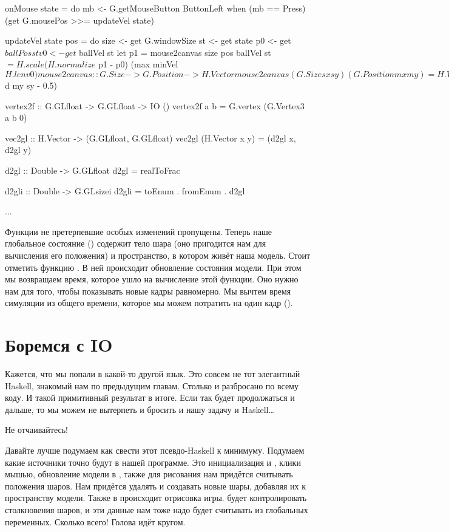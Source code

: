 \begin{code}
onMouse state = do    
    mb <- G.getMouseButton ButtonLeft
    when (mb == Press) (get G.mousePos >>= updateVel state)
   
updateVel state pos = do   
    size <- get G.windowSize
    st <- get state
    p0 <- get $ ballPos st
    v0 <- get $ ballVel st
    let p1 = mouse2canvas size pos
    ballVel st $= 
        H.scale (H.normalize $ p1 - p0) (max minVel $ H.len v0)

mouse2canvas :: G.Size -> G.Position -> H.Vector
mouse2canvas (G.Size sx sy) (G.Position mx my) = H.Vector x y
    where d a b  = fromIntegral a / fromIntegral b
          x  = width * (d mx sx - 0.5)
          y  = height * (negate $ d my sy - 0.5)


vertex2f :: G.GLfloat -> G.GLfloat -> IO ()
vertex2f a b = G.vertex (G.Vertex3 a b 0)

vec2gl :: H.Vector -> (G.GLfloat, G.GLfloat)
vec2gl (H.Vector x y) = (d2gl x, d2gl y)

d2gl :: Double -> G.GLfloat
d2gl = realToFrac

d2gli :: Double -> G.GLsizei
d2gli = toEnum . fromEnum . d2gl

...
\end{code}

Функции не претерпевшие особых изменений пропущены. 
Теперь наше глобальное состояние () содержит
тело шара (оно пригодится нам для вычисления его положения)
и пространство, в котором живёт наша модель. 
Стоит отметить функцию . В ней происходит
обновление состояния модели. При этом мы возвращаем
время, которое ушло на вычисление этой функции. 
Оно нужно нам для того, чтобы показывать новые кадры
равномерно. Мы вычтем время симуляции из общего времени,
которое мы можем потратить на один кадр (). 

\section{Боремся с IO}

Кажется, что мы попали в какой-то другой язык. 
Это совсем не тот элегантный Haskell, знакомый нам по 
предыдущим главам. Столько  и  разбросано
по всему коду. И такой примитивный результат в итоге.
Если так будет продолжаться и дальше, то мы можем 
не вытерпеть и бросить и нашу задачу и Haskell\dots

Не отчаивайтесь! 

Давайте лучше подумаем как свести этот псевдо-Haskell
к минимуму. Подумаем какие источники  точно будут
в нашей программе. Это инициализация  и ,
клики мышью, обновление модели в , также
для рисования нам придётся считывать положения шаров. 
Нам придётся удалять и создавать новые шары, добавляя
их к пространству модели. Также в  происходит
отрисовка игры.  будет контролировать столкновения
шаров, и эти данные нам тоже надо будет считывать из глобальных
переменных. Сколько всего! Голова идёт кругом. 

